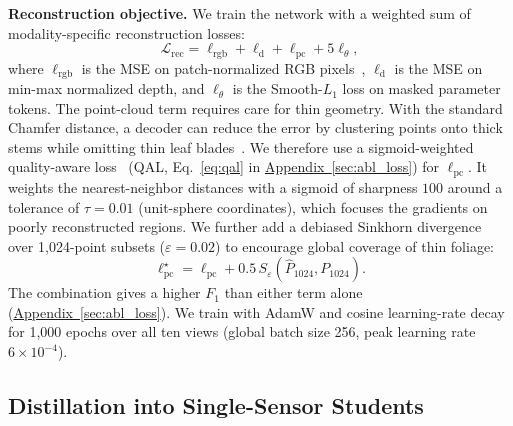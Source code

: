 \documentclass[10pt,twocolumn,letterpaper]{article}
\newcommand{\appendixref}[1]{\hyperref[#1]{Appendix~\ref*{#1}}}
\begin{document}
\noindent\textbf{Reconstruction objective.}
We train the network with a weighted sum of modality-specific reconstruction losses:
\begin{equation}
  \mathcal{L}_{\mathrm{rec}} = \ell_{\mathrm{rgb}} + \ell_{\mathrm{d}} + \ell_{\mathrm{pc}} + 5\ell_\theta,
  \label{eq:reconstruction-loss}
\end{equation}
where $\ell_{\mathrm{rgb}}$ is the MSE on patch-normalized RGB pixels~\citep{he2022mae}, $\ell_{\mathrm{d}}$ is the MSE on min-max normalized depth, and $\ell_\theta$ is the Smooth-$L_1$ loss on masked parameter tokens. The point-cloud term requires care for thin geometry. With the standard Chamfer distance, a decoder can reduce the error by clustering points onto thick stems while omitting thin leaf blades~\citep{wu2021dcd,song2026structural}. We therefore use a sigmoid-weighted quality-aware loss~\citep{meshram2026qal} (QAL, Eq.~\eqref{eq:qal} in \appendixref{sec:abl_loss}) for $\ell_{\mathrm{pc}}$. It weights the nearest-neighbor distances with a sigmoid of sharpness $100$ around a tolerance of $\tau = 0.01$ (unit-sphere coordinates), which focuses the gradients on poorly reconstructed regions. We further add a debiased Sinkhorn divergence~\citep{feydy2019sinkhorn} over 1{,}024-point subsets ($\varepsilon = 0.02$) to encourage global coverage of thin foliage:
\begin{equation}
  \ell_{\mathrm{pc}}^{\star} = \ell_{\mathrm{pc}} + 0.5\,S_{\varepsilon}\!\left(\hat P_{1024}, P_{1024}\right).
  \label{eq:point-loss-sinkhorn}
\end{equation}
The combination gives a higher $F_1$ than either term alone (\appendixref{sec:abl_loss}). We train with AdamW and cosine learning-rate decay for 1{,}000 epochs over all ten views (global batch size 256, peak learning rate $6 \times 10^{-4}$).

\subsection{Distillation into Single-Sensor Students}
\label{sec:distill}\label{sec:method-distill}
\end{document}
